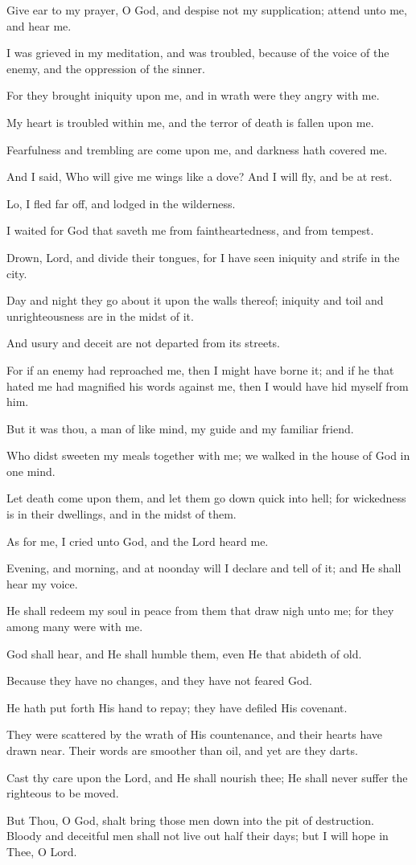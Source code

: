 Give ear to my prayer, O God, and despise not my supplication; attend unto me, and hear me.

I was grieved in my meditation, and was troubled, because of the voice of the enemy, and the oppression of the sinner.

For they brought iniquity upon me, and in wrath were they angry with me.

My heart is troubled within me, and the terror of death is fallen upon me.

Fearfulness and trembling are come upon me, and darkness hath covered me.

And I said, Who will give me wings like a dove? And I will fly, and be at rest.

Lo, I fled far off, and lodged in the wilderness.

I waited for God that saveth me from faintheartedness, and from tempest.

Drown, Lord, and divide their tongues, for I have seen iniquity and strife in the city.

Day and night they go about it upon the walls thereof; iniquity and toil and unrighteousness are in the midst of it.

And usury and deceit are not departed from its streets.

For if an enemy had reproached me, then I might have borne it; and if he that hated me had magnified his words against me, then I would have hid myself from him.

But it was thou, a man of like mind, my guide and my familiar friend.

Who didst sweeten my meals together with me; we walked in the house of God in one mind.

Let death come upon them, and let them go down quick into hell; for wickedness is in their dwellings, and in the midst of them.

As for me, I cried unto God, and the Lord heard me.

Evening, and morning, and at noonday will I declare and tell of it; and He shall hear my voice.

He shall redeem my soul in peace from them that draw nigh unto me; for they among many were with me.

God shall hear, and He shall humble them, even He that abideth of old.

Because they have no changes, and they have not feared God.

He hath put forth His hand to repay; they have defiled His covenant.

They were scattered by the wrath of His countenance, and their hearts have drawn near. Their words are smoother than oil, and yet are they darts.

Cast thy care upon the Lord, and He shall nourish thee; He shall never suffer the righteous to be moved.

But Thou, O God, shalt bring those men down into the pit of destruction. Bloody and deceitful men shall not live out half their days; but I will hope in Thee, O Lord.

